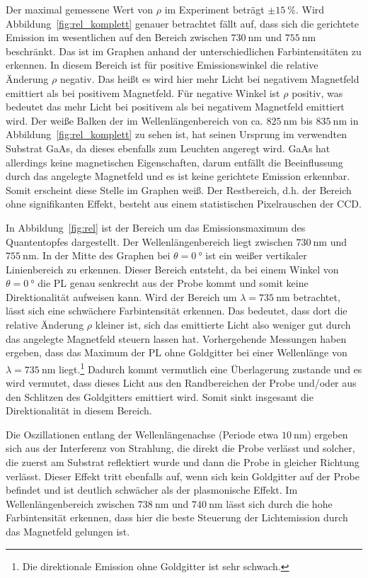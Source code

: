 \FloatBarrier
Der maximal gemessene Wert von $\rho$ im Experiment beträgt $\pm \SI{15}{\percent}$. 
Wird Abbildung~\ref{fig:rel_komplett} genauer betrachtet fällt auf, dass sich die 
gerichtete Emission im wesentlichen auf den Bereich zwischen $\SI{730}{\nano\meter}$ und $\SI{755}{\nano\meter}$
beschränkt.
Das ist im Graphen anhand der unterschiedlichen Farbintensitäten zu erkennen. 
In diesem Bereich ist für positive Emissionswinkel die relative Änderung $\rho$ negativ.
Das heißt es wird hier mehr Licht bei negativem Magnetfeld emittiert als bei positivem Magnetfeld.
Für negative Winkel ist $\rho$ positiv, was bedeutet das mehr Licht bei positivem als bei negativem Magnetfeld emittiert wird.
Der weiße Balken der im Wellenlängenbereich von ca. $\SI{825}{\nano\meter}$ bis $\SI{835}{\nano\meter}$ 
in Abbildung~\ref{fig:rel_komplett} zu sehen ist, 
hat seinen Ursprung im verwendten Substrat GaAs, 
da dieses ebenfalls zum Leuchten angeregt wird.
GaAs hat allerdings keine magnetischen Eigenschaften, 
darum entfällt die Beeinflussung durch das angelegte Magnetfeld
und es ist keine gerichtete Emission erkennbar.
Somit erscheint diese Stelle im Graphen weiß.
Der Restbereich, d.h. der Bereich ohne signifikanten Effekt, besteht aus einem statistischen Pixelrauschen der CCD.

In Abbildung~\ref{fig:rel} ist der Bereich um das Emissionsmaximum des Quantentopfes dargestellt.
Der Wellenlängenbereich liegt zwischen $\SI{730}{\nano\meter}$ und $\SI{755}{\nano\meter}$.
In der Mitte des Graphen bei $\theta = \SI{0}{\degree}$ ist ein weißer vertikaler Linienbereich zu erkennen.
Dieser Bereich entsteht, da bei einem Winkel von $\theta = \SI{0}{\degree}$ die PL genau senkrecht aus der Probe kommt
und somit keine Direktionalität aufweisen kann.
Wird der Bereich um  $\lambda = \SI{735}{\nano\meter}$ betrachtet, 
lässt sich eine schwächere Farbintensität erkennen.
Das bedeutet, dass dort die relative Änderung $\rho$ kleiner ist, sich das emittierte Licht also
weniger gut durch das angelegte Magnetfeld steuern lassen hat.
Vorhergehende Messungen haben ergeben, dass das Maximum der PL ohne Goldgitter bei 
einer Wellenlänge von $\lambda = \SI{735}{\nano\meter}$ liegt.\footnote{Die direktionale Emission ohne Goldgitter
ist sehr schwach.}
Dadurch kommt vermutlich eine Überlagerung zustande und 
es wird vermutet, dass dieses Licht aus den Randbereichen der Probe und/oder aus den Schlitzen des Goldgitters 
emittiert wird. 
Somit sinkt insgesamt die Direktionalität in diesem Bereich.

Die Oszillationen entlang der Wellenlängenachse (Periode etwa $\SI{10}{\nano\meter}$) 
ergeben sich aus der Interferenz von Strahlung, die direkt die Probe verlässt und solcher, 
die zuerst am Substrat reflektiert wurde und dann die Probe in gleicher Richtung verlässt. 
Dieser Effekt tritt ebenfalls auf, 
wenn sich kein Goldgitter auf der Probe befindet und ist deutlich schwächer als der plasmonische Effekt.\cite{lars}
Im Wellenlängenbereich zwischen $\SI{738}{\nano\meter}$ und $\SI{740}{\nano\meter}$ lässt sich durch die hohe
Farbintensität erkennen, dass hier die beste Steuerung der Lichtemission durch das Magnetfeld gelungen ist.

